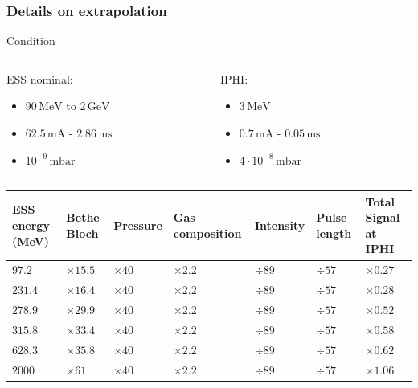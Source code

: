\begin{frame}[t]
  \frametitle{Details on extrapolation}
  \begin{block}{Condition}
    \begin{columns}[T]
      \begin{column}{0.45\textwidth}
        ESS nominal:
        \begin{itemize}
          \item $90\,\mathrm{MeV}$ to $2\,\mathrm{GeV}$
          \item $62.5\,\mathrm{mA}$ - $2.86\,\mathrm{ms}$
          \item $10^{-9}\,\mathrm{mbar}$
        \end{itemize}
      \end{column}
      \begin{column}{0.45\textwidth}
        IPHI:
        \begin{itemize}
          \item $3\,\mathrm{MeV}$
          \item $0.7\,\mathrm{mA}$ - $0.05\,\mathrm{ms}$
          \item $4 \cdot 10^{-8}\,\mathrm{mbar}$
        \end{itemize}
      \end{column}
    \end{columns}
  \end{block}
  \begin{tabularx}{\linewidth}{XXXXXXX}
    \toprule    ESS energy (MeV) & Bethe Bloch   & Pressure     & Gas composition & Intensity & Pulse length & Total Signal at IPHI \\
    \midrule
    \(97.2\)                     & $\times 15.5$ & $\times 40 $ & $\times 2.2$    & $\div89$  & $\div57$     & $\times 0.27$        \\
    \(231.4\)                    & $\times 16.4$ & $\times 40$  & $\times 2.2$    & $\div89$  & $\div57$     & $\times 0.28$        \\
    \(278.9\)                    & $\times 29.9$ & $\times 40$  & $\times 2.2$    & $\div89$  & $\div57$     & $\times 0.52$        \\
    \(315.8\)                    & $\times 33.4$ & $\times 40$  & $\times 2.2$    & $\div89$  & $\div57$     & $\times 0.58$        \\
    \(628.3\)                    & $\times 35.8$ & $\times 40$  & $\times 2.2$    & $\div89$  & $\div57$     & $\times 0.62$        \\
    \(2000\)                     & $\times 61$   & $\times 40$  & $\times 2.2$    & $\div89$  & $\div57$     & $\times 1.06$        \\
    \bottomrule
  \end{tabularx}
\end{frame}

